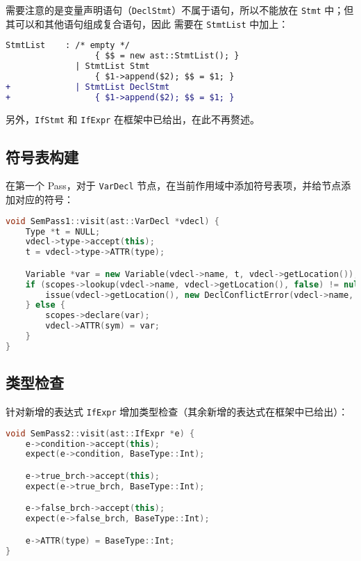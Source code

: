 \documentclass[a4paper]{article}
\begin{document}
需要注意的是变量声明语句（\texttt{DeclStmt}）不属于语句，所以不能放在 \texttt{Stmt} 中；但其可以和其他语句组成复合语句，因此
需要在 \texttt{StmtList} 中加上：

\begin{lstlisting}[language=diff]
  StmtList    : /* empty */
                  { $$ = new ast::StmtList(); }
              | StmtList Stmt
                  { $1->append($2); $$ = $1; }
+             | StmtList DeclStmt
+                 { $1->append($2); $$ = $1; }
\end{lstlisting}

另外，\texttt{IfStmt} 和 \texttt{IfExpr} 在框架中已给出，在此不再赘述。

\subsection{符号表构建}

在第一个 Pass，对于 \texttt{VarDecl} 节点，在当前作用域中添加符号表项，并给节点添加对应的符号：

\begin{lstlisting}[language=c++]
void SemPass1::visit(ast::VarDecl *vdecl) {
    Type *t = NULL;
    vdecl->type->accept(this);
    t = vdecl->type->ATTR(type);

    Variable *var = new Variable(vdecl->name, t, vdecl->getLocation());
    if (scopes->lookup(vdecl->name, vdecl->getLocation(), false) != nullptr) {
        issue(vdecl->getLocation(), new DeclConflictError(vdecl->name, var));
    } else {
        scopes->declare(var);
        vdecl->ATTR(sym) = var;
    }
}
\end{lstlisting}

\subsection{类型检查}

针对新增的表达式 \texttt{IfExpr} 增加类型检查（其余新增的表达式在框架中已给出）：

\begin{lstlisting}[language=c++]
void SemPass2::visit(ast::IfExpr *e) {
    e->condition->accept(this);
    expect(e->condition, BaseType::Int);

    e->true_brch->accept(this);
    expect(e->true_brch, BaseType::Int);

    e->false_brch->accept(this);
    expect(e->false_brch, BaseType::Int);

    e->ATTR(type) = BaseType::Int;
}
\end{lstlisting}
\end{document}
